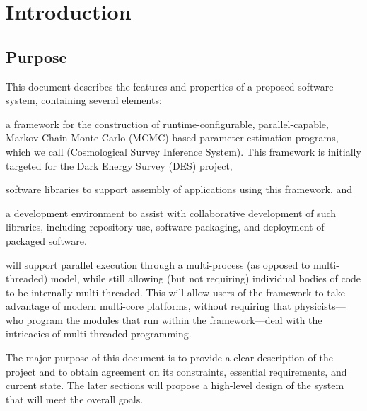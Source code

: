 \documentclass[draftmode,draftwater]{memarticle}
\newcommand{\cosmosis}{\name{CosmoSIS}\xspace}
\begin{document}
	
\topmatter	%

\chapter{Introduction\label{ch:introduction}}

\section{Purpose\label{sec:purpose}}

This document describes the features and properties of a proposed
software system, containing several elements:
\begin{inparaenum}[(a)]
\item a framework for the construction of runtime-configurable,
parallel-capable, Markov Chain Monte Carlo (MCMC)-based parameter estimation programs, which we
call \cosmosis (Cosmological Survey Inference System). This framework is initially targeted for the Dark Energy
Survey (DES)\cite{des} project,
\item software libraries to support assembly of applications using this
  framework, and
\item a development environment to assist with collaborative development
 of such libraries, including repository use, software packaging, and
 deployment of packaged software.
\end{inparaenum}

\cosmosis will support parallel execution through a multi-process (as
opposed to multi-threaded) model, while still allowing (but not
requiring) individual bodies of code to be internally
multi-threaded. This will allow users of the framework to take
advantage of modern multi-core platforms, without requiring that
physicists---who program the modules that run within
the framework---deal with the intricacies of multi-threaded
programming.

The major purpose of this document is to provide a clear description
of the project and to obtain agreement on its constraints,
essential requirements, and current state.  The later sections will
propose a high-level design of the system that will meet the overall goals.

\end{document}
